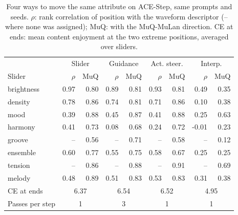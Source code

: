 \begin{table}[t]\centering\footnotesize\setlength{\tabcolsep}{2.5pt}
\begin{tabular}{lrrrrrrrr}
\toprule
 & \multicolumn{2}{c}{Slider} & \multicolumn{2}{c}{Guidance} & \multicolumn{2}{c}{Act. steer.} & \multicolumn{2}{c}{Interp.} \\
Slider & $\rho$ & MuQ & $\rho$ & MuQ & $\rho$ & MuQ & $\rho$ & MuQ \\
\midrule
brightness & 0.97 & 0.80 & 0.89 & 0.81 & 0.93 & 0.81 & 0.49 & 0.35 \\
density & 0.78 & 0.86 & 0.74 & 0.81 & 0.71 & 0.86 & 0.10 & 0.38 \\
mood & 0.39 & 0.88 & 0.45 & 0.87 & 0.41 & 0.88 & 0.25 & 0.63 \\
harmony & 0.41 & 0.73 & 0.08 & 0.68 & 0.24 & 0.72 & -0.01 & 0.23 \\
groove & -- & 0.56 & -- & 0.71 & -- & 0.58 & -- & 0.12 \\
ensemble & 0.60 & 0.77 & 0.55 & 0.75 & 0.58 & 0.67 & 0.25 & 0.25 \\
tension & -- & 0.86 & -- & 0.88 & -- & 0.91 & -- & 0.69 \\
melody & 0.48 & 0.89 & 0.51 & 0.83 & 0.53 & 0.83 & 0.31 & 0.38 \\
\midrule
CE at ends & \multicolumn{2}{c}{6.37} & \multicolumn{2}{c}{6.54} & \multicolumn{2}{c}{6.52} & \multicolumn{2}{c}{4.95} \\
Passes per step & \multicolumn{2}{c}{1} & \multicolumn{2}{c}{3} & \multicolumn{2}{c}{1} & \multicolumn{2}{c}{1} \\
\bottomrule
\end{tabular}
\caption{Four ways to move the same attribute on ACE-Step, same prompts and seeds. $\rho$: rank correlation of position with the waveform descriptor (-- where none was assigned); MuQ: with the MuQ-MuLan direction. CE at ends: mean content enjoyment at the two extreme positions, averaged over sliders.}\label{tab:methods}
\end{table}
